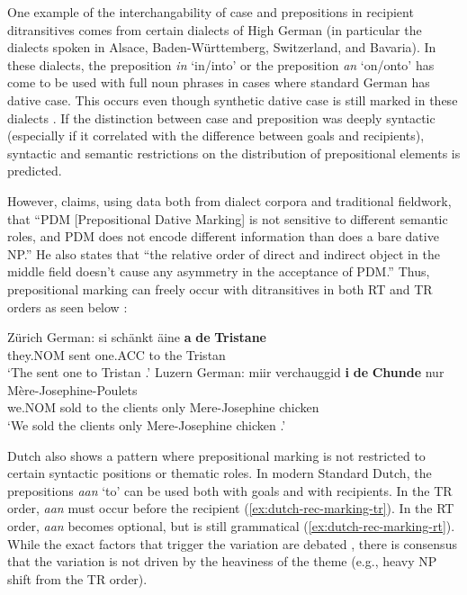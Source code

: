 	One example of the interchangability of case and prepositions in recipient ditransitives comes from certain dialects of High German (in particular the dialects spoken in Alsace, Baden-Württemberg, Switzerland, and Bavaria). In these dialects, the preposition \textit{in} `in/into' or the preposition \textit{an} `on/onto' has come to be used with full noun phrases in cases where standard German has dative case. This occurs even though synthetic dative case is still marked in these dialects \citep{Seiler.2001,Seiler.2003}. If the distinction between case and preposition was deeply syntactic (especially if it correlated with the difference between goals and recipients), syntactic and semantic restrictions on the distribution of prepositional elements is predicted. 
	
	However, \cite{Seiler.2001} claims, using data both from dialect corpora and traditional fieldwork, that ``PDM [Prepositional Dative Marking] is not sensitive to different semantic roles, and PDM does not encode different information than does a bare dative NP.'' He also states that ``the relative order of direct and indirect object in the middle field doesn't cause any asymmetry in the acceptance of PDM.'' Thus, prepositional marking can freely occur with ditransitives in both RT and TR orders as seen below \citep{Seiler.2001,Seiler.2003}:
	\begin{exe}
		\ex Zürich German:\label{ex:zurich}
		\gll si schänkt äine \textbf{a} \textbf{de} \textbf{Tristane}\\
		they.NOM sent one.ACC to the Tristan\\
		\trans `The sent one to Tristan \citep[pg. 175]{Seiler.2003}.'
		\ex Luzern German:\label{ex:luzern}
		\gll miir verchauggid \textbf{i} \textbf{de} \textbf{Chunde} nur Mère-Josephine-Poulets\\
		we.NOM sold to the clients only Mere-Josephine chicken\\
		`We sold the clients only Mere-Josephine chicken \citep[pg. 175]{Seiler.2003}.'

	\end{exe}
	Dutch also shows a pattern where prepositional marking is not restricted to certain syntactic positions or thematic roles. In modern Standard Dutch, the prepositions \textit{aan} `to' can be used both with goals and with recipients. In the TR order, \textit{aan} must occur before the recipient (\ref{ex:dutch-rec-marking-tr}). In the RT order, \textit{aan} becomes optional, but is still grammatical (\ref{ex:dutch-rec-marking-rt}). While the exact factors that trigger the variation are debated \citep{vanBelle.1996b,Colleman.2010b}, there is consensus that the variation is not driven by the heaviness of the theme (e.g., heavy NP shift from the TR order). 
